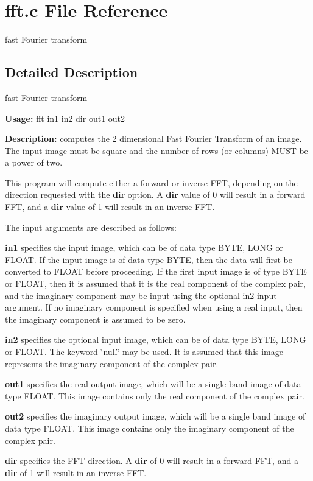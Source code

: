 \section{fft.c File Reference}
\label{fft_8c}
fast Fourier transform 



\subsection{Detailed Description}
fast Fourier transform 

{\bf Usage:} fft in1 in2 dir out1 out2

{\bf Description:} computes the 2 dimensional Fast Fourier Transform of an image. The input image must be square and the number of rows (or columns) MUST be a power of two.

This program will compute either a forward or inverse FFT, depending on the direction requested with the {\bf dir} option. A {\bf dir} value of 0 will result in a forward FFT, and a {\bf dir} value of 1 will result in an inverse FFT.

The input arguments are described as follows:

{\bf in1} specifies the input image, which can be of data type BYTE, LONG or FLOAT. If the input image is of data type BYTE, then the data will first be converted to FLOAT before proceeding. If the first input image is of type BYTE or FLOAT, then it is assumed that it is the real component of the complex pair, and the imaginary component may be input using the optional in2 input argument. If no imaginary component is specified when using a real input, then the imaginary component is assumed to be zero.

{\bf in2} specifies the optional input image, which can be of data type BYTE, LONG or FLOAT. The keyword \char`\"{}null\char`\"{} may be used. It is assumed that this image represents the imaginary component of the complex pair.

{\bf out1} specifies the real output image, which will be a single band image of data type FLOAT. This image contains only the real component of the complex pair.

{\bf out2} specifies the imaginary output image, which will be a single band image of data type FLOAT. This image contains only the imaginary component of the complex pair.

{\bf dir} specifies the FFT direction. A {\bf dir} of 0 will result in a forward FFT, and a {\bf dir} of 1 will result in an inverse FFT.

